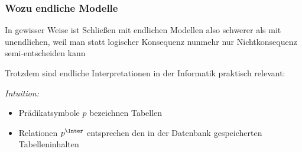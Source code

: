 \documentclass[aspectratio=1610,onlymath]{beamer}
\begin{document}

\begin{frame}\frametitle{Wozu endliche Modelle}

In gewisser Weise ist Schließen mit endlichen Modellen also schwerer als mit unendlichen, weil man statt logischer Konsequenz nunmehr nur Nichtkonsequenz semi-entscheiden kann
\bigskip

Trotzdem sind endliche Interpretationen in der Informatik praktisch relevant:\medskip

\emph{Intuition:}
\begin{itemize}
\item Prädikatsymbole $p$ bezeichnen Tabellen
\item Relationen $p^\Inter$ entsprechen den in der Datenbank gespeicherten Tabelleninhalten
\end{itemize}

\end{frame}
\end{document}
